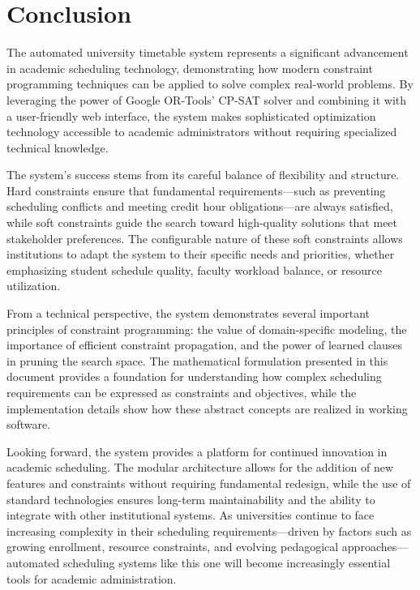 \documentclass[12pt,a4paper]{article}
\begin{document}
\section{Conclusion}

The automated university timetable system represents a significant advancement in academic scheduling technology, demonstrating how modern constraint programming techniques can be applied to solve complex real-world problems. By leveraging the power of Google OR-Tools' CP-SAT solver and combining it with a user-friendly web interface, the system makes sophisticated optimization technology accessible to academic administrators without requiring specialized technical knowledge.

The system's success stems from its careful balance of flexibility and structure. Hard constraints ensure that fundamental requirements—such as preventing scheduling conflicts and meeting credit hour obligations—are always satisfied, while soft constraints guide the search toward high-quality solutions that meet stakeholder preferences. The configurable nature of these soft constraints allows institutions to adapt the system to their specific needs and priorities, whether emphasizing student schedule quality, faculty workload balance, or resource utilization.

From a technical perspective, the system demonstrates several important principles of constraint programming: the value of domain-specific modeling, the importance of efficient constraint propagation, and the power of learned clauses in pruning the search space. The mathematical formulation presented in this document provides a foundation for understanding how complex scheduling requirements can be expressed as constraints and objectives, while the implementation details show how these abstract concepts are realized in working software.

Looking forward, the system provides a platform for continued innovation in academic scheduling. The modular architecture allows for the addition of new features and constraints without requiring fundamental redesign, while the use of standard technologies ensures long-term maintainability and the ability to integrate with other institutional systems. As universities continue to face increasing complexity in their scheduling requirements—driven by factors such as growing enrollment, resource constraints, and evolving pedagogical approaches—automated scheduling systems like this one will become increasingly essential tools for academic administration.
\end{document}
